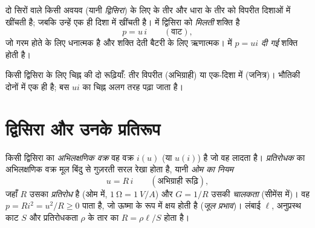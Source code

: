 \begin{notation}[रूढ़ियाँ और शक्ति]\label{not:b1:dc-circuits:conventions}
दो सिरों वाले किसी अवयव (यानी \emph{द्विसिरा}) के लिए \emph{}
 के तीर और धारा के तीर को विपरीत दिशाओं में खींचती है; जबकि
\emph{} उन्हें एक ही दिशा में खींचती है।  में
द्विसिरा को \emph{मिलती} शक्ति है
\[
p = u\,i \qquad (\text{वाट}),
\]
जो गरम होते  के लिए धनात्मक है और शक्ति देती बैटरी के लिए ऋणात्मक।
 में $p = ui$ \emph{दी गई} शक्ति
होती है।
\end{notation}

\begin{omfigure}

{\small किसी द्विसिरा के लिए चिह्न की दो रूढ़ियाँ: तीर विपरीत (अभिग्राही) या
एक-दिशा में (जनित्र)। भौतिकी दोनों में एक ही है; बस $ui$ का चिह्न अलग तरह
पढ़ा जाता है।}
\end{omfigure}

\section{द्विसिरा और उनके प्रतिरूप}

\begin{definition}[अभिलक्षणिक वक्र; प्रतिरोधक; ओम का नियम]\label{def:b1:dc-circuits:resistor}
किसी द्विसिरा का \emph{अभिलक्षणिक वक्र} वह वक्र $i(u)$ (या $u(i)$) है जो वह
लादता है। \emph{प्रतिरोधक} का अभिलक्षणिक वक्र मूल बिंदु से गुज़रती सरल रेखा
होता है, यानी \emph{ओम का नियम}
\[
u = R\,i \qquad (\text{अभिग्राही रूढ़ि}),
\]
जहाँ $R$ उसका \emph{प्रतिरोध} है (ओम में, $\qty{1}{\ohm} = \qty{1}{V/A}$) और
$G = 1/R$ उसकी \emph{चालकता} (सीमेंस में)। वह $p = Ri^2 =
u^2/R \geq 0$ पाता है, जो ऊष्मा के रूप में क्षय होती है (\emph{जूल प्रभाव})।
लंबाई $\ell$, अनुप्रस्थ काट $S$ और प्रतिरोधकता $\rho$ के तार का
$R = \rho\ell/S$ होता है।
\end{definition}


